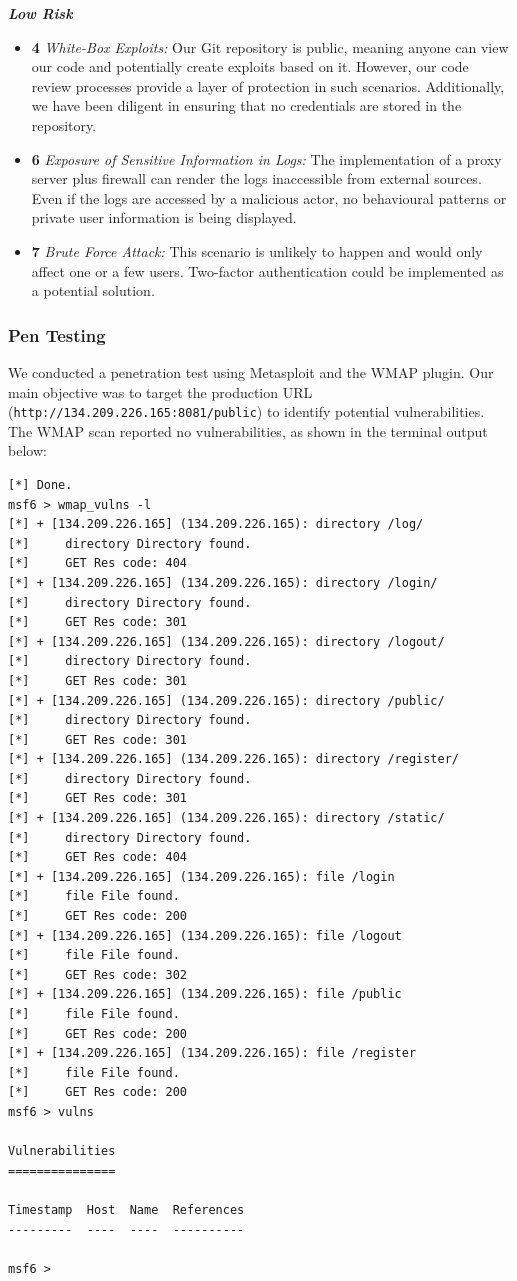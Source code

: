 \documentclass{article}
\begin{document}
\vspace{0.4em}
\textit{\textbf{Low Risk}}\vspace{0.2em}
\begin{itemize}
    \item \textbf{4} \textit{White-Box Exploits:} Our Git repository is public, meaning anyone can view our code and potentially create exploits based on it. However, our code review processes provide a layer of protection in such scenarios. Additionally, we have been diligent in ensuring that no credentials are stored in the repository.
    \item \textbf{6} \textit{Exposure of Sensitive Information in Logs:} The implementation of a proxy server plus firewall can render the logs inaccessible from external sources. Even if the logs are accessed by a malicious actor, no behavioural patterns or private user information is being displayed. 
    \item \textbf{7} \textit{Brute Force Attack:} This scenario is unlikely to happen and would only affect one or a few users. Two-factor authentication could be implemented as a potential solution. 
\end{itemize}

\subsubsection{Pen Testing}
We conducted a penetration test using Metasploit and the WMAP plugin. Our main objective was to target the production URL (\texttt{http://134.209.226.165:8081/public}) to identify potential vulnerabilities. The WMAP scan reported no vulnerabilities, as shown in the terminal output below:
\begin{verbatim}
[*] Done.
msf6 > wmap_vulns -l
[*] + [134.209.226.165] (134.209.226.165): directory /log/
[*] 	directory Directory found.
[*] 	GET Res code: 404
[*] + [134.209.226.165] (134.209.226.165): directory /login/
[*] 	directory Directory found.
[*] 	GET Res code: 301
[*] + [134.209.226.165] (134.209.226.165): directory /logout/
[*] 	directory Directory found.
[*] 	GET Res code: 301
[*] + [134.209.226.165] (134.209.226.165): directory /public/
[*] 	directory Directory found.
[*] 	GET Res code: 301
[*] + [134.209.226.165] (134.209.226.165): directory /register/
[*] 	directory Directory found.
[*] 	GET Res code: 301
[*] + [134.209.226.165] (134.209.226.165): directory /static/
[*] 	directory Directory found.
[*] 	GET Res code: 404
[*] + [134.209.226.165] (134.209.226.165): file /login
[*] 	file File found.
[*] 	GET Res code: 200
[*] + [134.209.226.165] (134.209.226.165): file /logout
[*] 	file File found.
[*] 	GET Res code: 302
[*] + [134.209.226.165] (134.209.226.165): file /public
[*] 	file File found.
[*] 	GET Res code: 200
[*] + [134.209.226.165] (134.209.226.165): file /register
[*] 	file File found.
[*] 	GET Res code: 200
msf6 > vulns

Vulnerabilities
===============

Timestamp  Host  Name  References
---------  ----  ----  ----------

msf6 > 
\end{verbatim}
\end{document}
